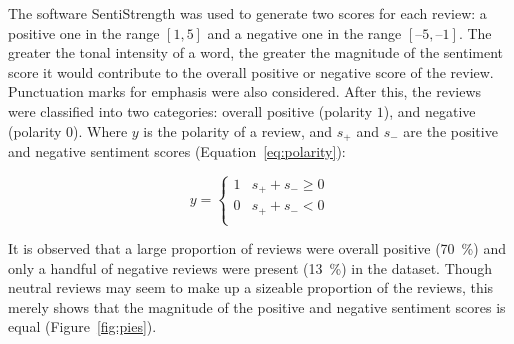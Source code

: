 \documentclass[11pt, a4paper]{pancake-article}
\begin{document}
The software SentiStrength was used to generate two scores for each review:
a positive one in the range \(\left[1, 5\right]\) and a negative one
in the range \(\left[–5, –1\right]\).
The greater the tonal intensity of a word, the greater the magnitude
of the sentiment score
it would contribute to the overall positive or negative score of the
review. Punctuation marks for
emphasis were also considered. After this, the reviews were
classified into two categories: overall
positive (polarity \(1\)), and negative (polarity \(0\)). Where \(y\)
is the polarity
of a review, and \(s_+\) and \(s_-\) are the positive and negative
sentiment scores (Equation~\ref{eq:polarity}):

\begin{equation}
  y =
  \begin{cases}
    1 & s_+ + s_- \geq 0 \\
    0 & s_+ + s_- < 0    \\
  \end{cases}
  \label{eq:polarity}
\end{equation}

It is observed that a large proportion of reviews were overall
positive (\qty{70}{\percent})
and only a handful of negative reviews were present
(\qty{13}{\percent}) in the dataset.
Though neutral reviews may seem to make up a sizeable proportion of
the reviews, this merely
shows that the magnitude of the positive and negative sentiment
scores is equal (Figure~\ref{fig:pies}).
\end{document}
